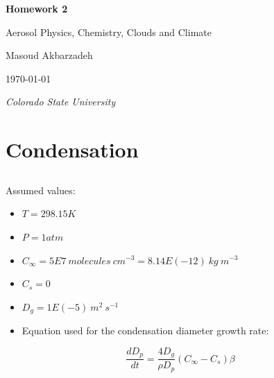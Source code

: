 \documentclass[12pt]{article}
\begin{document}
\begin{titlepage}
\centering
{\LARGE\bfseries Homework 2}

\vspace{1cm}

{\Large Aerosol Physics, Chemistry, Clouds and Climate}

\vspace{2cm}

{\large Masoud Akbarzadeh}

\vspace{2cm}

{ \today }

\vfill

{\itshape Colorado State University}
\end{titlepage}



\section{Condensation}\label{sec:problem-1}
\subsection{}\label{subsec:problem-1-a}
Assumed values:
\begin{itemize}
    \item $T = 298.15K$
    \item $P = 1atm$
    \item $C_\infty = 5E7\ molecules\ cm^{-3} = 8.14E(-12)\  kg\ m^{-3}$
    \item $C_s = 0$
    \item $D_g = 1E(-5)\ m^2\ s^{-1}$
    \item Equation used for the condensation diameter growth rate:
\end{itemize}

\[\frac{dD_p}{dt}=\frac{4D_g}{\rho D_p}(C_\infty-C_s)\beta\]
\end{document}
